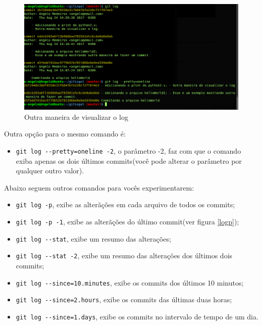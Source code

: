 \documentclass[12pt,openright,oneside,a4paper,english,brazil]{abntex2}
\begin{document}
\begin{figure}[h]
	\caption{\label{pretty}Outra maneira de visualizar o log}
	\begin{center}
		\includegraphics[width=1\linewidth]{pretty}
	\end{center}
\end{figure}

Outra opção para o mesmo comando é:

\begin{itemize}
	\item \verb|git log --pretty=oneline -2|, o parâmetro -2, faz com que o comando exiba apenas os dois últimos commits(você pode alterar o parâmetro por qualquer outro valor).
\end{itemize}

Abaixo seguem outros comandos para vocês experimentarem:

\begin{itemize}
	\item \verb|git log -p|, exibe as alterãções em cada arquivo de todos os commits;
	\item \verb|git log -p -1|, exibe as alterãções do último commit(ver figura \ref{logp});
	\item \verb|git log --stat|, exibe um resumo das alterações;
	\item \verb|git log --stat -2|, exibe um resumo das alterações dos últimos dois commits;
	\item \verb|git log --since=10.minutes|, exibe os commits dos últimos 10 minutos;
	\item \verb|git log --since=2.hours|, exibe os commits das últimas duas horas;
	\item \verb|git log --since=1.days|, exibe os commits no intervalo de tempo de um dia.
\end{itemize}
\end{document}
